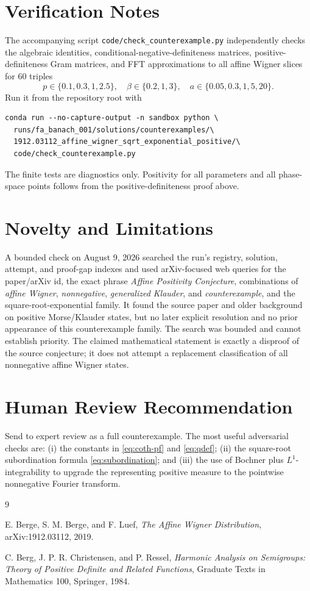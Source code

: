 \documentclass[11pt]{article}
\begin{document}
\section*{Verification Notes}

The accompanying script \texttt{code/check\_counterexample.py} independently
checks the algebraic identities, conditional-negative-definiteness matrices,
positive-definiteness Gram matrices, and FFT approximations to all affine
Wigner slices for 60 triples
\[
 p\in\{0.1,0.3,1,2.5\},\quad
 \beta\in\{0.2,1,3\},\quad
 a\in\{0.05,0.3,1,5,20\}.
\]
Run it from the repository root with
\begin{verbatim}
conda run --no-capture-output -n sandbox python \
  runs/fa_banach_001/solutions/counterexamples/\
  1912.03112_affine_wigner_sqrt_exponential_positive/\
  code/check_counterexample.py
\end{verbatim}
The finite tests are diagnostics only. Positivity for all parameters and all
phase-space points follows from the positive-definiteness proof above.

\section*{Novelty and Limitations}

A bounded check on August 9, 2026 searched the run's registry, solution,
attempt, and proof-gap indexes and used arXiv-focused web queries for the
paper/arXiv id, the exact phrase \emph{Affine Positivity Conjecture},
combinations of \emph{affine Wigner}, \emph{nonnegative},
\emph{generalized Klauder}, and \emph{counterexample}, and the
square-root-exponential family. It found the source paper and older background
on positive Morse/Klauder states, but no later explicit resolution and no
prior appearance of this counterexample family. The search was bounded and
cannot establish priority. The claimed mathematical statement is exactly a
disproof of the source conjecture; it does not attempt a replacement
classification of all nonnegative affine Wigner states.

\section*{Human Review Recommendation}

Send to expert review as a full counterexample. The most useful adversarial
checks are: (i) the constants in \eqref{eq:coth-pf} and \eqref{eq:qdef};
(ii) the square-root subordination formula \eqref{eq:subordination}; and
(iii) the use of Bochner plus \(L^1\)-integrability to upgrade the representing
positive measure to the pointwise nonnegative Fourier transform.

\begin{thebibliography}{9}

E. Berge, S. M. Berge, and F. Luef,
\emph{The Affine Wigner Distribution},
arXiv:1912.03112, 2019.

C. Berg, J. P. R. Christensen, and P. Ressel,
\emph{Harmonic Analysis on Semigroups: Theory of Positive Definite and Related
Functions}, Graduate Texts in Mathematics 100, Springer, 1984.

\end{thebibliography}
\end{document}
